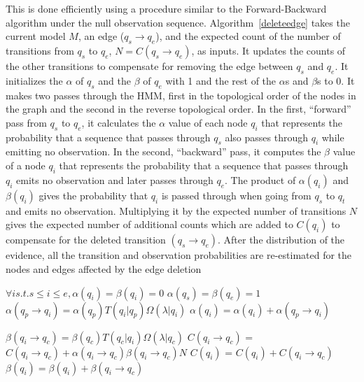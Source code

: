 \documentclass[letterpaper]{article}
\begin{document}
This is done efficiently using a procedure similar to the
Forward-Backward algorithm under the null observation sequence.
Algorithm~\ref{deleteedge} takes the current model $M$, an edge
($q_s \rightarrow q_e$), and the expected count of the number of transitions
from $q_s$ to $q_e$, $N = C(q_s \rightarrow q_e)$,
as inputs. It updates the counts of
the other transitions to compensate for removing the edge between
$q_s$ and $q_e$. It initializes the $\alpha$ of $q_s$ and the $\beta$
of $q_e$ with 1 and the rest of the $\alpha$s and $\beta$s to $0$.
It makes two passes through the HMM,
first in the topological order of the nodes in the graph and the second
in the reverse topological order. In the first, ``forward'' pass
from $q_s$ to $q_e$,
it calculates  the $\alpha$ value of each node $q_i$
that represents the probability that a sequence that
passes through $q_s$ also passes through $q_i$
while emitting no observation. In the second, ``backward'' pass,
it computes the $\beta$ value of a node $q_i$
that represents the probability that a sequence that passes
through
$q_i$ emits no observation and later
passes through $q_e$. The product of
$\alpha(q_i)$ and $\beta(q_i)$ gives the probability that
$q_i$ is passed through when going from $q_s$ to $q_t$ and emits
no observation. Multiplying it by the
expected number of transitions $N$ gives the
expected number of additional counts %
which are added to $C(q_i)$
to compensate for the deleted transition $(q_s \rightarrow q_e)$.
After the distribution of the evidence,
all the transition and observation probabilities are re-estimated for
the nodes and edges affected by the edge deletion

\begin{algorithm}
\footnotesize
\begin{algorithmic}


\State $\forall i s.t. s \leq i \leq e, \alpha(q_i) = \beta(q_i) = 0$
   \State $\alpha(q_s) = \beta(q_e) = 1$
      \State  $\alpha(q_p \rightarrow q_i) = \alpha(q_p) T(q_i|q_p) \Omega(\lambda|q_i)$
      \State $\alpha(q_i) = \alpha(q_i) + \alpha(q_p \rightarrow q_i)$
\EndFor
\EndFor

      \State  $\beta(q_i \rightarrow q_c) = \beta(q_c) T(q_c|q_i) \Omega(\lambda|q_c)$
      \State  $C(q_i \rightarrow q_c)$ = $C(q_i \rightarrow q_c) + \alpha(q_i \rightarrow q_c)  \beta(q_i \rightarrow q_c) N$
      \State  $C(q_i)$ = $C(q_i) + C(q_i \rightarrow q_c)$
      \State $\beta(q_i) = \beta(q_i) + \beta(q_i \rightarrow q_c)$
\EndFor
\EndFor
\EndProcedure

\end{algorithmic}
\label{deleteedge}
\caption{Forward-Backward algorithm to delete an edge and re-distribute the expected counts.}
\end{algorithm}
\end{document}
